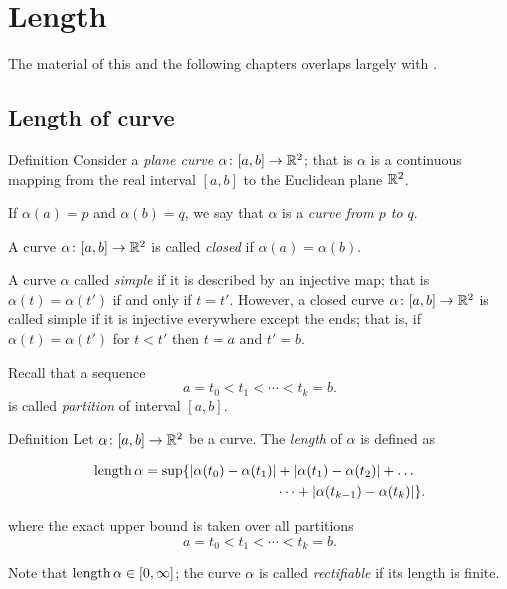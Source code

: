 \chapter{Length}

The material of this and the following chapters overlaps largely with \cite[Chapter 5]{fuchs-tabachnikov}.

\section{Length of curve}


\begin{thm}{Definition}\label{def:curve}
Consider a \emph{plane curve} $\alpha\:[a,b]\z\to \RR^2$;
that is $\alpha$ is a continuous mapping from the real interval $[a,b]$ to the Euclidean plane $\mathbb{R}^2$. 


If $\alpha(a)=p$ and $\alpha(b)=q$,
we say that $\alpha$ is a \emph{curve from $p$ to $q$}.

A curve $\alpha\colon[a,b]\to \mathbb{R}^2$ is called \emph{closed} if $\alpha(a)=\alpha(b)$.

A curve $\alpha$ called \emph{simple} if it is described by an injective map;
that is $\alpha(t)=\alpha(t')$ if and only if $t=t'$.
However, a closed curve $\alpha\colon[a,b]\to \mathbb{R}^2$ is called simple if it is injective 
everywhere except the ends; that is, if
$\alpha(t)=\alpha(t')$ for $t<t'$ then $t=a$ and $t'=b$.
\end{thm}
 
Recall that a sequence 
\[a=t_0 < t_1 < \cdots < t_k=b.\]
is called \emph{partition} of interval $[a,b]$.

\begin{thm}{Definition}\label{def:length}
Let $\alpha\colon[a,b]\to \mathbb{R}^2$ be a curve.
The \emph{length} of $\alpha$ is defined as

\begin{align*}
\mathop{\rm length}\nolimits \alpha
= 
\sup \{|\alpha(t_0)-\alpha(t_1)|&+|\alpha(t_1)-\alpha(t_2)|+\dots
\\
&\dots+|\alpha(t_{k-1})-\alpha(t_k)|\}. 
\end{align*}

where the exact upper bound is taken over all partitions
\[a=t_0 < t_1 < \cdots < t_k=b.\]

Note that $\mathop{\rm length}\nolimits\alpha\in[0,\infty]$;
the curve $\alpha$ is called \emph{rectifiable} if its length is finite.
\end{thm}

